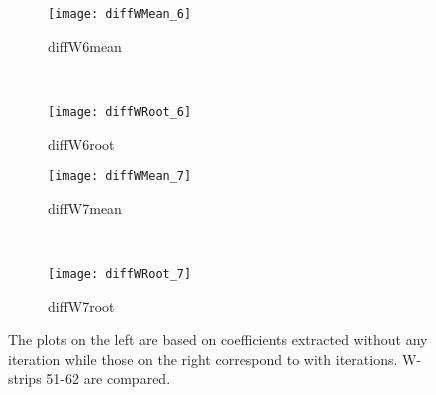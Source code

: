 \begin{figure}[h]
    \centering
    \begin{subfigure}[h]{0.44\textwidth}
        \centering
        \texttt{[image: diffWMean\_6]}
        \caption{diffW6mean}
        \label{fig:diffW6mean}
    \end{subfigure}
    ~
    \begin{subfigure}[h]{0.44\textwidth}
        \centering
        \texttt{[image: diffWRoot\_6]}
        \caption{diffW6root}
        \label{fig:diffW6root}
    \end{subfigure}
    
    \begin{subfigure}[h]{0.44\textwidth}
        \centering
        \texttt{[image: diffWMean\_7]}
        \caption{diffW7mean}
        \label{fig:diffW7mean}
    \end{subfigure}
    ~
    \begin{subfigure}[h]{0.44\textwidth}
        \centering
        \texttt{[image: diffWRoot\_7]}
        \caption{diffW7root}
        \label{fig:diffW7root}
    \end{subfigure}
    \caption{The plots on the left are based on coefficients extracted without any iteration while those on the right correspond to with 
    iterations. W-strips 51-62 are compared.}
    \label{fig:diffW}
\end{figure}
\FloatBarrier
